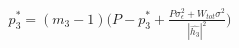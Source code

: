 \documentclass[preview]{standalone}
\begin{document}
\begin{align*}
p_3^\ast = \left(m_3 - 1\right) \Bigg( P - p_3^\ast + \frac{P \sigma_\epsilon^2 + W_{tot} \sigma^2}{\left|\hat{h_3}\right|^2} \Bigg)
\end{align*}
\end{document}
